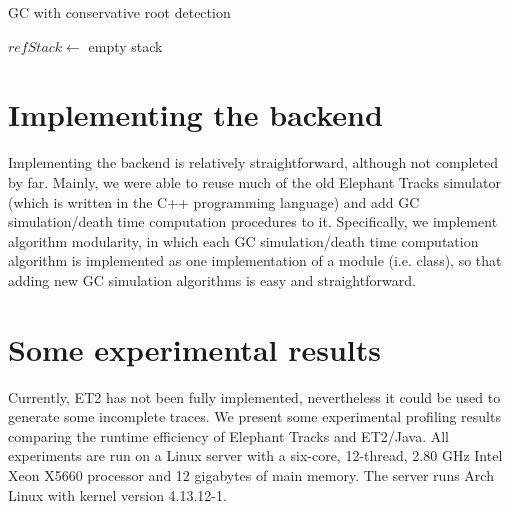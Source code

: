 \begin{algorithm}[H]
  \caption{GC with conservative root detection}
  $refStack \leftarrow$ empty stack\; 
\end{algorithm}


\section{Implementing the backend}
Implementing the backend is relatively straightforward, although not completed by far. Mainly, we were able to reuse much of the old Elephant Tracks
simulator (which is written in the C++ programming language) and add GC simulation/death time computation procedures to it. Specifically, we implement
algorithm modularity, in which each GC simulation/death time computation algorithm is implemented as one implementation of a module (i.e. class), so that
adding new GC simulation algorithms is easy and straightforward.


\section{Some experimental results}
Currently, ET2 has not been fully implemented, nevertheless it could be used to generate some incomplete traces. We present some experimental profiling
results comparing the runtime efficiency of Elephant Tracks and ET2/Java. All experiments are run on a Linux server with a six-core, 12-thread, 2.80 GHz Intel
Xeon X5660 processor and 12 gigabytes of main memory. The server runs Arch Linux with kernel version 4.13.12-1.

